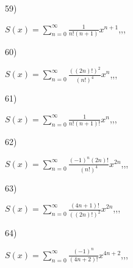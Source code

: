 \documentclass[11pt, ukrainian]{article}
\begin{document}
\par
\vspace{0.9cm}
59) \space 
{%
{$S(x)=\sum\limits_{n=0}^{\infty}{\frac{1}{n!(n+1)}}{x^{{n+1}}}$},,, \par \smallskip  
}
\par
\vspace{0.9cm}
60) \space 
{%
{$S(x)=\sum\limits_{n=0}^{\infty}{\frac{((2n)!)^2}{(n!)^4}}{x^{{n}}}$},,, \par \smallskip  
}
\par
\vspace{0.9cm}
61) \space 
{%
{$S(x)=\sum\limits_{n=0}^{\infty}{\frac{1}{n!(n+1)!}}{x^{{n}}}$},,, \par \smallskip  
}
\par
\vspace{0.9cm}
62) \space 
{%
{$S(x)=\sum\limits_{n=0}^{\infty}{\frac{{(-1)^n}(2n)!}{(n!)^4}}{x^{{2n}}}$},,, \par \smallskip  
}
\par
\vspace{0.9cm}
63) \space 
{%
{$S(x)=\sum\limits_{n=0}^{\infty}{\frac{(4n+1)!}{((2n)!)^2}}{x^{{2n}}}$},,, \par \smallskip  
}
\par
\vspace{0.9cm}
64) \space 
{%
{$S(x)=\sum\limits_{n=0}^{\infty}{\frac{(-1)^n}{(4n+2)!}}{x^{{4n+2}}}$},,, \par \smallskip  
}
\end{document}
